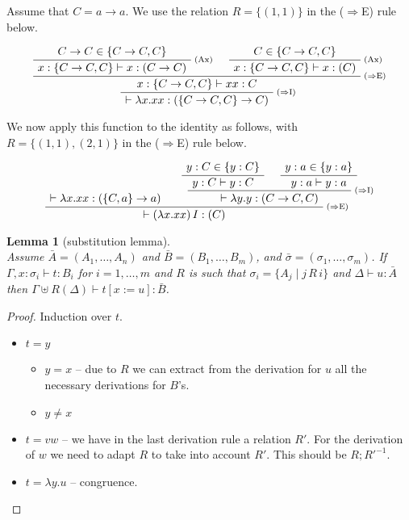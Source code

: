 \documentclass[10pt,a4paper]{article}
\theoremstyle{plain}%
\newtheorem{lemma}[theorem]{Lemma}
\begin{document}
\bigskip

Assume that $C = a\to a$. We use the relation $R = \{(1,1)\}$ in the
($\Rightarrow$E) rule below.

\[
  \begin{gathered}
    \RightLabel{\scriptsize (Ax)}
    \AxiomC{$C\to C \in \{C\to C, C\}$}
    \UnaryInfC{$x:\{C\to C, C\} \vdash x : (C\to C)$}
    \RightLabel{\scriptsize (Ax)}
    \AxiomC{$C \in \{C\to C, C\}$}
    \UnaryInfC{$x:\{C\to C, C\} \vdash x : (C)$}
    \RightLabel{\scriptsize ($\Rightarrow$E)}
    \BinaryInfC{$x : \{C\to C, C\} \vdash xx : C$}
    \RightLabel{\scriptsize ($\Rightarrow$I)}
    \UnaryInfC{$\vdash \lambda x.xx : (\{C\to C, C\} \to C)$}
    \DisplayProof
\end{gathered}
\]

We now apply this function to the identity as follows, with $R =
\{(1,1),(2,1)\}$
in the ($\Rightarrow$E) rule below.

\[
\AxiomC{$\vdash \lambda x.xx : (\{C, a\} \to a)$}
\AxiomC{$y:C\in\{y:C\}$}
\UnaryInfC{$y:C\vdash y : C$}
\AxiomC{$y:a\in\{y:a\}$}
\UnaryInfC{$y:a\vdash y : a$}
\RightLabel{\scriptsize ($\Rightarrow$I)}
\BinaryInfC{$ \vdash \lambda y.y : (C\to C,C)$}
\RightLabel{\scriptsize ($\Rightarrow$E)}
\BinaryInfC{$\vdash (\lambda x.xx)\,I:(C)$}
\DisplayProof
\]

\begin{lemma}[substitution lemma]
  ~\\
  Assume $\bar{A} = (A_1,\ldots,A_n)$ and $\bar{B} =
  (B_1,\ldots,B_m)$, and $\bar{\sigma} =
  (\sigma_1,\ldots,\sigma_m)$.
  If $\Gamma, x:\sigma_i\vdash t : B_i$ %
  for $i=1,\ldots,m$ and $R$ is such that $\sigma_i = \{A_j \mid j\, R\, i\}$
  and $\Delta\vdash u : \bar{A}$ %
  then $\Gamma\uplus R(\Delta) \vdash t[x:=u] : \bar{B}$.
  
\end{lemma}
\begin{proof}
  Induction over $t$.

  \begin{itemize}
  \item $t=y$
    \begin{itemize}
    \item $y=x$ -- due to $R$ we can extract from the derivation for
      $u$ all the necessary derivations for $B$'s.
    \item $y\not=x$
    \end{itemize}
  \item $t=vw$ -- we have in the last derivation rule a relation
    $R'$. For the derivation of $w$ we need to adapt $R$ to take into
    account $R'$. This should be $R;R'^{-1}$.
  \item $t=\lambda y.u$ -- congruence.
  \end{itemize}
\end{proof}
\end{document}
